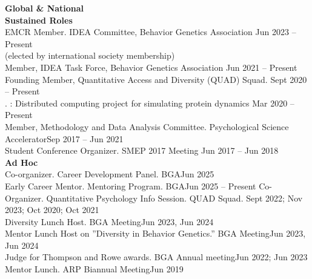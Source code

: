 {\large \textbf{Global \& National}}\\
\textrm{\textbf{Sustained Roles}}\\
EMCR Member. IDEA Committee, Behavior Genetics Association \hfill{Jun 2023 – Present}\\ %
\hspace*{25pt}(elected by international society membership)\\
Member, IDEA Task Force, Behavior Genetics Association \hfill{Jun 2021 – Present}\\
Founding Member, Quantitative Access and Diversity (QUAD) Squad. \hfill{Sept 2020 – Present}\\%
. : Distributed computing project for simulating protein dynamics \hfill{Mar 2020 – Present}\\
Member, Methodology and Data Analysis Committee. Psychological Science Accelerator\hfill{Sep 2017 – Jun 2021}\\
Student Conference Organizer. SMEP 2017 Meeting \hfill{Jun 2017 – Jun 2018}\medskip\\
\textrm{\textbf{Ad Hoc}}\\
Co-organizer. Career Development Panel. BGA\hfill{Jun 2025}\\
Early Career Mentor. Mentoring Program. BGA\hfill{Jun 2025 – Present}\newline
Co-Organizer. Quantitative Psychology Info Session. QUAD Squad. \hfill{Sept 2022; Nov 2023;}\newline
\hspace*{0pt}\hfill{Oct 2020; Oct 2021}\\
Diversity Lunch Host. BGA Meeting\hfill{Jun 2023, Jun 2024}\\%
Mentor Lunch Host on ''Diversity in Behavior Genetics.'' BGA Meeting\hfill{Jun 2023, Jun 2024}\\
Judge for Thompson and Rowe awards. BGA Annual meeting\hfill{Jun 2022; Jun 2023}\\
Mentor Lunch. ARP Biannual Meeting\hfill{Jun 2019}\\
